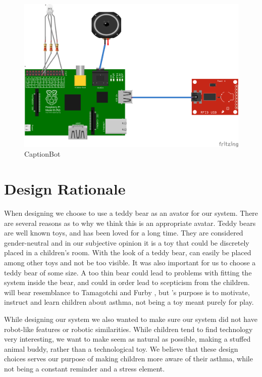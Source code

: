 \begin{figure}[H] 
	\centering
		\includegraphics[width=0.6\paperwidth]{Pictures/pi-fritzing-model.png}
	\caption{ CaptionBot }
	\label{fig:pi-fritzing}
\end{figure}

\section{Design Rationale}
When designing \buddy{} we choose to use a teddy bear as an avator for our system. There are several reasons as to why we think this is an appropriate avatar. Teddy bears are well known toys, and has been loved for a long time. They are considered gender-neutral \cite{stagnitti1997determining} \cite{cherney2006gender} and in our subjective opinion it is a toy that could be discretely placed in a children's room. With the look of a teddy bear, \buddy{} can easily be placed among other toys and not be too visible. It was also important for us to choose a teddy bear of some size. A too thin bear could lead to problems with fitting the system inside the bear, and could in order lead to scepticism from the children. \buddy{} will bear resemblance to Tamagotchi \cite{tamagotchi} and Furby \cite{furby}, but \buddy{}'s purpose is to motivate, instruct and learn children about asthma, not being a toy meant purely for play. 

While designing our system we also wanted to make sure our system did not have robot-like features or robotic similarities. While children tend to find technology very interesting, we want to make \buddy{} seem as natural as possible, making a stuffed animal buddy, rather than a technological toy. We believe that these design choices serves our purpose of making children more aware of their asthma, while not being a constant reminder and a stress element.

